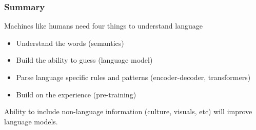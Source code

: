 \begin{frame}[fragile]\frametitle{Summary}
Machines like humans need four things to understand language

\begin{itemize}
\item Understand the words (semantics)
\item Build the ability to guess (language model)
\item Parse language specific rules and patterns (encoder-decoder, transformers)
\item Build on the experience (pre-training)
\end{itemize}

Ability to include non-language information (culture, visuals, etc) will improve language models.

\end{frame}